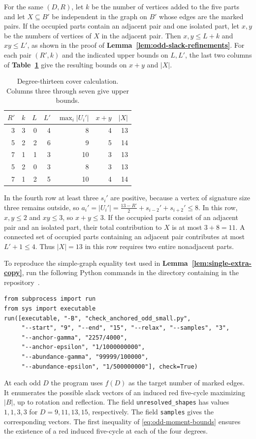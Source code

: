 For the same $(D,R)$, let $k$ be the number of vertices added to
the five parts and let $X\subseteq B'$ be independent in the graph
on $B'$ whose edges are the marked pairs. If the occupied parts contain an adjacent pair and
one isolated part, let $x,y$ be the numbers of vertices of $X$ in
the adjacent pair. Then $x,y\le L+k$ and $xy\le L'$, as shown in
the proof of \textbf{Lemma~\ref{lem:odd-slack-refinements}}.
For each pair $(R',k)$ and the indicated upper bounds on $L,L'$, the
last two columns of \textbf{Table~\ref{tab:thirteen-cover-check}} give
the resulting bounds on $x+y$ and $|X|$.
\begin{table}[H]
\centering
\begin{tabular}{@{}rrrrrrr@{}}
\toprule
$R'$ & $k$ & $L$ & $L'$ & $\max_i|U_i'|$ & $x+y$ & $|X|$\\
\midrule
3&3&0&4&8&4&13\\
5&2&2&6&9&5&14\\
7&1&1&3&10&3&13\\
5&2&0&3&8&3&13\\
7&1&2&5&10&4&14\\
\bottomrule
\end{tabular}
\caption{Degree-thirteen cover calculation. Columns three through
seven give upper bounds.}
\label{tab:thirteen-cover-check}
\end{table}
In the fourth row at least three $s_i'$ are positive, because a
vertex of signature size three remains outside, so
$a_i'=|U_i'|=\frac{13-R'}{2}+s_{i-2}'+s_{i+2}'\le8$.
In this row, $x,y\le2$ and $xy\le3$, so
$x+y\le3$. If the occupied parts consist of an adjacent pair and
an isolated part, their total contribution to $X$ is at most
$3+8=11$. A connected set of occupied parts containing an adjacent
pair contributes at most $L'+1\le4$. Thus $|X|=13$ in this row
requires two entire nonadjacent parts.

\noindent\begin{minipage}{\linewidth}
To reproduce the simple-graph equality test used in
\textbf{Lemma~\ref{lem:single-extra-copy}}, run the following Python
commands in the directory containing 
in the repository~\cite{FGSTCode}.
\begin{verbatim}
from subprocess import run
from sys import executable
run([executable, "-B", "check_anchored_odd_small.py",
     "--start", "9", "--end", "15", "--relax", "--samples", "3",
     "--anchor-gamma", "2257/4000",
     "--anchor-epsilon", "1/1000000000",
     "--abundance-gamma", "99999/100000",
     "--abundance-epsilon", "1/500000000"], check=True)
\end{verbatim}
\end{minipage}\par
At each odd $D$ the program uses $f(D)$ as the target number of marked
edges. It enumerates the possible slack vectors of an induced red
five-cycle maximizing $|B|$, up to rotation and reflection.
The field \texttt{unresolved\_shapes} has values
$1,1,3,3$ for $D=9,11,13,15$, respectively. The field
\texttt{samples} gives the corresponding vectors. The first
inequality of \eqref{eq:odd-moment-bounds} ensures the existence
of a red induced five-cycle at each of the four degrees.


